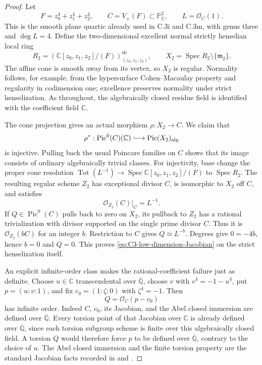 \begin{proof}
Let
\[
 F=z_0^4+z_1^4+z_2^4,\qquad
 C=V_+(F)\subset\mathbb P^2_{\mathbb C},\qquad
 L=\mathcal O_C(1).
\]
This is the smooth plane quartic already used in
C.3i and C.3m, with genus three and $\deg L=4$.
Define the two-dimensional excellent normal
strictly henselian local ring
\[
 R_2=
 \left(\mathbb C[z_0,z_1,z_2]/(F)\right)_{(z_0,z_1,z_2)}^{\mathrm{sh}},
 \qquad
 X_2=\operatorname{Spec}R_2\setminus\{\mathfrak m_2\}.
\]
The affine cone is smooth away from its vertex,
so $X_2$ is regular. Normality follows, for example,
from the hypersurface Cohen--Macaulay property and
regularity in codimension one; excellence preserves
normality under strict henselization. As throughout,
the algebraically closed residue field is identified
with the coefficient field $\mathbb C$.

The cone projection gives an actual morphism
$\rho:X_2\to C$. We claim that
\begin{equation}\label{eq:C3-low-dimension-Jacobian}
 \rho^*:\operatorname{Pic}^0(C)(\mathbb C)
       \lhook\joinrel\longrightarrow
       \operatorname{Pic}(X_2)_{\mathrm{alg}}
\end{equation}
is injective. Pulling back the usual Poincare
families on $C$ shows that its image consists of
ordinary algebraically trivial classes.
For injectivity, base change the proper cone
resolution $\operatorname{Tot}(L^{-1})\to
\operatorname{Spec}\mathbb C[z_0,z_1,z_2]/(F)$
to $\operatorname{Spec}R_2$. The resulting regular
scheme $Z_2$ has exceptional divisor $C$, is
isomorphic to $X_2$ off $C$, and satisfies
\[
                 \mathcal O_{Z_2}(C)|_C=L^{-1}.
\]
If $Q\in\operatorname{Pic}^0(C)$ pulls back to
zero on $X_2$, its pullback to $Z_2$ has a rational
trivialization with divisor supported on the single
prime divisor $C$. Thus it is $\mathcal O_{Z_2}(bC)$
for an integer $b$. Restriction to $C$ gives
$Q\simeq L^{-b}$. Degrees give $0=-4b$, hence
$b=0$ and $Q=0$. This proves
\eqref{eq:C3-low-dimension-Jacobian} on the strict
henselization itself.

An explicit infinite-order class makes the
rational-coefficient failure just as definite.
Choose $u\in\mathbb C$ transcendental over
$\overline{\mathbb Q}$, choose $v$ with
$v^4=-1-u^4$, put $p=(u:v:1)$, and fix
$c_0=(1:\zeta:0)$ with $\zeta^4=-1$. Then
\[
                         Q=\mathcal O_C(p-c_0)
\]
has infinite order. Indeed $C$, $c_0$, its
Jacobian, and the Abel closed immersion are
defined over $\overline{\mathbb Q}$. Every
torsion point of that Jacobian over $\mathbb C$
is already defined over $\overline{\mathbb Q}$,
since each torsion subgroup scheme is finite
over this algebraically closed field. A torsion
$Q$ would therefore force $p$ to be defined
over $\overline{\mathbb Q}$, contrary to the
choice of $u$. The Abel closed immersion and
the finite torsion property are the standard
Jacobian facts recorded in
\citet[Propositions 2.1--2.3]{D_MilneJacobians2021}
and \citet[Section 12]{D_MilneAbelian2022}.


\end{proof}
